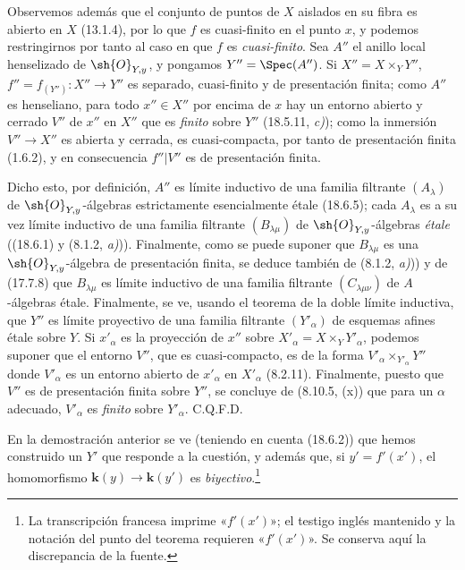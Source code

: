 Observemos además que el conjunto de puntos de $X$ aislados en su fibra es abierto en $X$ (13.1.4), por lo que $f$ es cuasi-finito en el punto $x$, y podemos restringirnos por tanto al caso en que $f$ es \emph{cuasi-finito}. Sea $A''$ el anillo local henselizado de $\sh{O}_{Y,y}$, y pongamos $Y''=\Spec(A'')$. Si $X''=X\times_Y Y''$, $f''=f_{(Y'')}:X''\to Y''$ es separado, cuasi-finito y de presentación finita; como $A''$ es henseliano, para todo $x''\in X''$ por encima de $x$ hay un entorno abierto y cerrado $V''$ de $x''$ en $X''$ que es \emph{finito} sobre $Y''$ (18.5.11, \emph{c)}); como la inmersión $V''\to X''$ es abierta y cerrada, es cuasi-compacta, por tanto de presentación finita (1.6.2), y en consecuencia $f''|V''$ es de presentación finita.

Dicho esto, por definición, $A''$ es límite inductivo de una familia filtrante $(A_\lambda)$ de $\sh{O}_{Y,y}$-álgebras estrictamente esencialmente étale (18.6.5); cada $A_\lambda$ es a su vez límite inductivo de una familia filtrante $(B_{\lambda\mu})$ de $\sh{O}_{Y,y}$-álgebras \emph{étale} ((18.6.1) y (8.1.2, \emph{a)})). Finalmente, como se puede suponer que $B_{\lambda\mu}$ es una $\sh{O}_{Y,y}$-álgebra de presentación finita, se deduce también de (8.1.2, \emph{a)})) y de (17.7.8) que $B_{\lambda\mu}$ es límite inductivo de una familia filtrante $(C_{\lambda\mu\nu})$ de $A$-álgebras étale. Finalmente, se ve, usando el teorema de la doble límite inductiva, que $Y''$ es límite proyectivo de una familia filtrante $(Y'_\alpha)$ de esquemas afines étale sobre $Y$. Si $x'_\alpha$ es la proyección de $x''$ sobre $X'_\alpha=X\times_Y Y'_\alpha$, podemos suponer que el entorno $V''$, que es cuasi-compacto, es de la forma $V'_\alpha\times_{Y'_\alpha}Y''$ donde $V'_\alpha$ es un entorno abierto de $x'_\alpha$ en $X'_\alpha$ (8.2.11). Finalmente, puesto que $V''$ es de presentación finita sobre $Y''$, se concluye de (8.10.5, (x)) que para un $\alpha$ adecuado, $V'_\alpha$ es \emph{finito} sobre $Y'_\alpha$. C.Q.F.D.

\begin{remark}[18.12.2]
\label{IV.18.12.2}
En la demostración anterior se ve (teniendo en cuenta (18.6.2)) que hemos construido un $Y'$ que responde a la cuestión, y además que, si $y'=f'(x')$, el homomorfismo $\boldsymbol k(y)\to\boldsymbol k(y')$ es \emph{biyectivo}.\footnote{La transcripción francesa imprime «$f'(x')$»; el testigo inglés mantenido y la notación del punto del teorema requieren «$f'(x')$». Se conserva aquí la discrepancia de la fuente.}
\end{remark}

